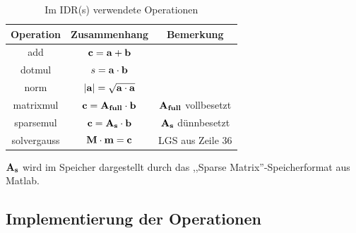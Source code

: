 \documentclass[journal]{IEEEtran}
\begin{document}
\begin{table}[h]
\renewcommand{\arraystretch}{1.3}
\caption{Im IDR(s) verwendete Operationen}
\label{idrsops}
\centering
\begin{tabular}{|c||c||c|}
\hline
\bfseries Operation & \bfseries Zusammenhang & \bfseries Bemerkung \\
\hline\hline


  add & $ \bf{c} = \bf{a} + \bf{b}$ & \\
  \hline
  dotmul & $ s = \bf{a} \cdot \bf{b}$ & \\
  \hline
  norm & $ |\bf{a}|= \sqrt{ \bf{a} \cdot \bf{a}}$ & \\
  \hline
  matrixmul & $ \bf{c}= \bf{A}_{full} \cdot {b} $ & $\bf{A_{full}}$ vollbesetzt\\
  \hline

  sparsemul & $   \bf{c} = \bf{A}_{s} \cdot \bf{b} $ & $\bf{A_{s}}$  dünnbesetzt \\
  \hline

  solvergauss & $  \bf{M} \cdot \bf{m} = \bf{c} $ &LGS aus Zeile 36 \cite{idrsm} \\

\hline
\end{tabular}
\end{table}

$\bf{A_{s}}$ wird im Speicher dargestellt durch das ,,Sparse Matrix''-Speicherformat
aus Matlab. \cite{matlabsparse}

%
%
%

\subsection{Implementierung der Operationen}
\end{document}
